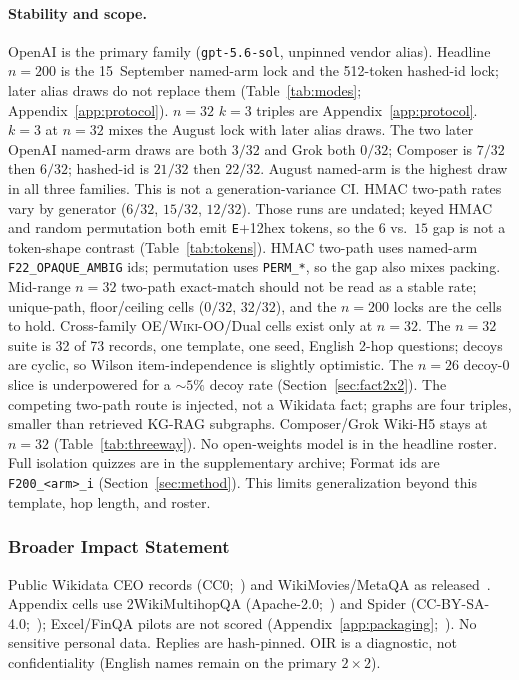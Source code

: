 \documentclass[10pt]{article} %
\begin{document}
\paragraph{Stability and scope.}
OpenAI is the primary family (\texttt{gpt-5.6-sol}, unpinned vendor alias).
Headline $n{=}200$ is the 15~September named-arm lock and the 512-token
hashed-id lock; later alias draws do not replace them
(Table~\ref{tab:modes}; Appendix~\ref{app:protocol}).
$n{=}32$ $k{=}3$ triples are Appendix~\ref{app:protocol}.
$k{=}3$ at $n{=}32$ mixes the August lock with later alias draws.
The two later OpenAI named-arm draws are both $3/32$ and Grok both
$0/32$; Composer is $7/32$ then $6/32$; hashed-id is $21/32$ then
$22/32$.
August named-arm is the highest draw in all three families.
This is not a generation-variance CI.
HMAC two-path rates vary by generator ($6/32$, $15/32$, $12/32$).
Those runs are undated; keyed HMAC and random permutation both emit
\texttt{E}+12hex tokens, so the $6$ vs.\ $15$ gap is not a token-shape
contrast (Table~\ref{tab:tokens}).
HMAC two-path uses named-arm \texttt{F22\_OPAQUE\_AMBIG} ids; permutation
uses \texttt{PERM\_*}, so the gap also mixes packing.
Mid-range $n{=}32$ two-path exact-match should not be read as a stable
rate; unique-path, floor/ceiling cells ($0/32$, $32/32$), and the
$n{=}200$ locks are the cells to hold.
Cross-family OE/\textsc{Wiki-OO}/Dual cells exist only at $n{=}32$.
The $n{=}32$ suite is 32 of 73 records, one template, one seed, English
2-hop questions; decoys are cyclic, so Wilson item-independence is
slightly optimistic.
The $n{=}26$ decoy-$0$ slice is underpowered for a ${\sim}5\%$ decoy rate
(Section~\ref{sec:fact2x2}).
The competing two-path route is injected, not a Wikidata fact; graphs are
four triples, smaller than retrieved KG-RAG subgraphs.
Composer/Grok Wiki-H5 stays at $n{=}32$ (Table~\ref{tab:threeway}).
No open-weights model is in the headline roster.
Full isolation quizzes are in the supplementary archive; Format ids are
\texttt{F200\_<arm>\_i}
(Section~\ref{sec:method}).
This limits generalization beyond this template, hop length, and roster.

\subsubsection*{Broader Impact Statement}

Public Wikidata CEO records (CC0;~\citealp{vrandecic2014wikidata}) and
WikiMovies/MetaQA as released~\citep{miller2016wikimovies,zhang2018metaqa}.
Appendix cells use 2WikiMultihopQA (Apache-2.0;~\citealp{ho2020constructing})
and Spider (CC-BY-SA-4.0;~\citealp{yu2018spider}); Excel/FinQA pilots are
not scored (Appendix~\ref{app:packaging};~\citealp{chen2021finqa}).
No sensitive personal data. Replies are hash-pinned.
OIR is a diagnostic, not confidentiality (English names remain on the
primary $2{\times}2$).
\end{document}
